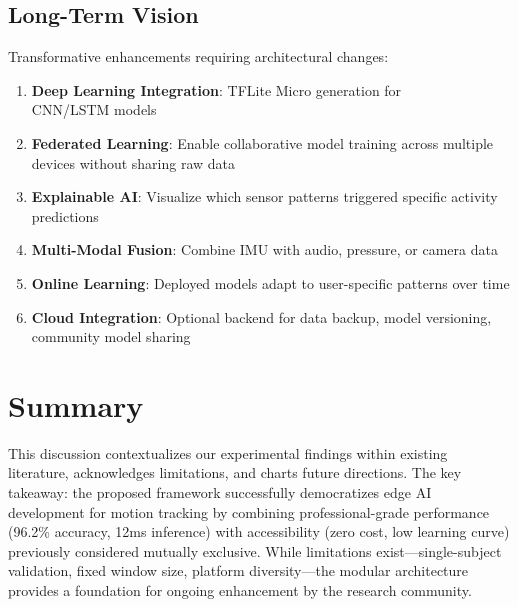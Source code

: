 \subsection{Long-Term Vision}
Transformative enhancements requiring architectural changes:
\begin{enumerate}
    \item \textbf{Deep Learning Integration}: TFLite Micro generation for\\CNN/LSTM models
    \item \textbf{Federated Learning}: Enable collaborative model training across multiple devices without sharing raw data
    \item \textbf{Explainable AI}: Visualize which sensor patterns triggered specific activity predictions
    \item \textbf{Multi-Modal Fusion}: Combine IMU with audio, pressure, or camera data
    \item \textbf{Online Learning}: Deployed models adapt to user-specific patterns over time
    \item \textbf{Cloud Integration}: Optional backend for data backup, model versioning, community model sharing
\end{enumerate}

\section{Summary}
This discussion contextualizes our experimental findings within existing literature, acknowledges limitations, and charts future directions. The key takeaway: the proposed framework successfully democratizes edge AI development for motion tracking by combining professional-grade performance (96.2\% accuracy, 12ms inference) with accessibility (zero cost, low learning curve) previously considered mutually exclusive. While limitations exist—single-subject validation, fixed window size, platform diversity—the modular architecture provides a foundation for ongoing enhancement by the research community.